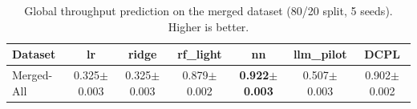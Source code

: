 \begin{table}[t]
\centering
\small
\begin{tabular}{lcccccc}
\toprule
Dataset & lr & ridge & rf_light & nn & llm_pilot & DCPL \\
\midrule
Merged-All & 0.325$\pm$0.003 & 0.325$\pm$0.003 & 0.879$\pm$0.002 & \textbf{0.922$\pm$0.003} & 0.507$\pm$0.003 & 0.902$\pm$0.002 \\
\bottomrule
\end{tabular}

\caption{Global throughput prediction on the merged dataset (80/20 split, 5 seeds). Higher is better.}
\label{tab:global_r2_baseline_vs_dcpl}
\end{table}
